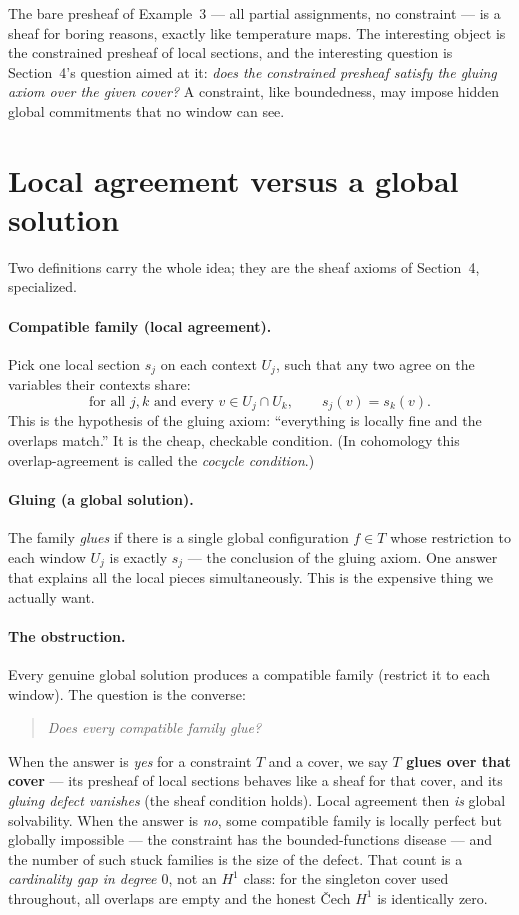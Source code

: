 \documentclass[11pt]{article}
\begin{document}
The bare presheaf of Example~3 --- all partial assignments, no
constraint --- is a sheaf for boring reasons, exactly like temperature
maps.  The interesting object is the constrained presheaf of local
sections, and the interesting question is Section~4's question aimed at
it: \emph{does the constrained presheaf satisfy the gluing axiom over
the given cover?}  A constraint, like boundedness, may impose hidden
global commitments that no window can see.

\section{Local agreement versus a global solution}
Two definitions carry the whole idea; they are the sheaf axioms of
Section~4, specialized.

\paragraph{Compatible family (local agreement).}
Pick one local section $s_j$ on each context $U_j$, such that any two
agree on the variables their contexts share:
\[
  \text{for all }j,k \text{ and every } v\in U_j\cap U_k,\qquad
  s_j(v) = s_k(v).
\]
This is the hypothesis of the gluing axiom: ``everything is locally
fine and the overlaps match.''  It is the cheap, checkable condition.
(In cohomology this overlap-agreement is called the \emph{cocycle
condition}.)

\paragraph{Gluing (a global solution).}
The family \emph{glues} if there is a single global configuration
$f\in T$ whose restriction to each window $U_j$ is exactly $s_j$ ---
the conclusion of the gluing axiom.  One answer that explains all the
local pieces simultaneously.  This is the expensive thing we actually
want.

\paragraph{The obstruction.}
Every genuine global solution produces a compatible family (restrict it
to each window).  The question is the converse:
\begin{quote}
\emph{Does every compatible family glue?}
\end{quote}
When the answer is \emph{yes} for a constraint $T$ and a cover, we say
\textbf{$T$ glues over that cover} --- its presheaf of local sections
behaves like a sheaf for that cover, and its \emph{gluing defect
vanishes} (the sheaf condition holds).  Local agreement then \emph{is}
global solvability.  When the answer is \emph{no}, some compatible
family is locally perfect but globally impossible --- the constraint has
the bounded-functions disease --- and the number of such stuck families
is the size of the defect.  That count is a \emph{cardinality gap in
degree $0$}, not an $H^1$ class: for the singleton cover used
throughout, all overlaps are empty and the honest \v{C}ech $H^1$ is
identically zero.
\end{document}
